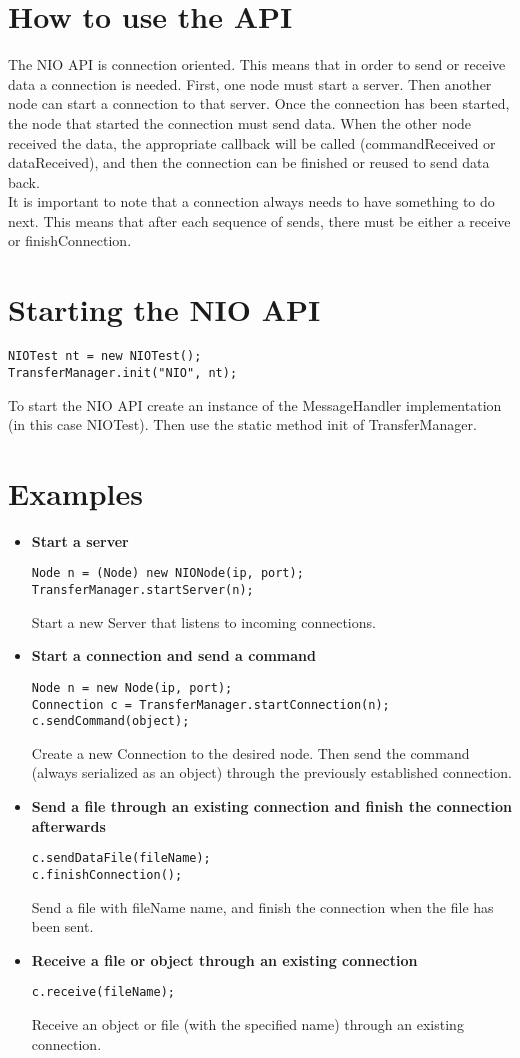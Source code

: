 \documentclass[10pt]{article}
\begin{document}
\section{How to use the API}
	The NIO API is connection oriented. This means that in order to send or receive data a connection is needed. First, one node must start a server. Then another node can start a connection to that server. Once the connection has been started, the node that started the connection must send data. When the other node received the data, the appropriate callback will be called (commandReceived or dataReceived), and then the connection can be finished or reused to send data back.
	\\It is important to note that a connection always needs to have something to do next. This means that after each sequence of sends, there must be either a receive or finishConnection.

\section{Starting the NIO API}
	\begin{lstlisting}
NIOTest nt = new NIOTest();
TransferManager.init("NIO", nt);
	\end{lstlisting}
	To start the NIO API create an instance of the MessageHandler implementation (in this case NIOTest). Then use the static method init of TransferManager.\\

\section{Examples}
\begin{itemize}
	\item \textbf{Start a server}
	\begin{lstlisting}
Node n = (Node) new NIONode(ip, port);
TransferManager.startServer(n);
	\end{lstlisting}
	Start a new Server that listens to incoming connections.
	\item \textbf{Start a connection and send a command}
	\begin{lstlisting}
Node n = new Node(ip, port);
Connection c = TransferManager.startConnection(n);
c.sendCommand(object);
	\end{lstlisting}
	Create a new Connection to the desired node. Then send the command (always serialized as an object) through the previously established connection.
\item \textbf{Send a file through an existing connection and finish the connection afterwards}
	\begin{lstlisting}
c.sendDataFile(fileName);
c.finishConnection();
	\end{lstlisting}
	Send a file with fileName name, and finish the connection when the file has been sent.
	
\item \textbf{Receive a file or object through an existing connection}
	\begin{lstlisting}
c.receive(fileName);
	\end{lstlisting}
	Receive an object or file (with the specified name) through an existing connection.
\end{itemize}
\end{document}

